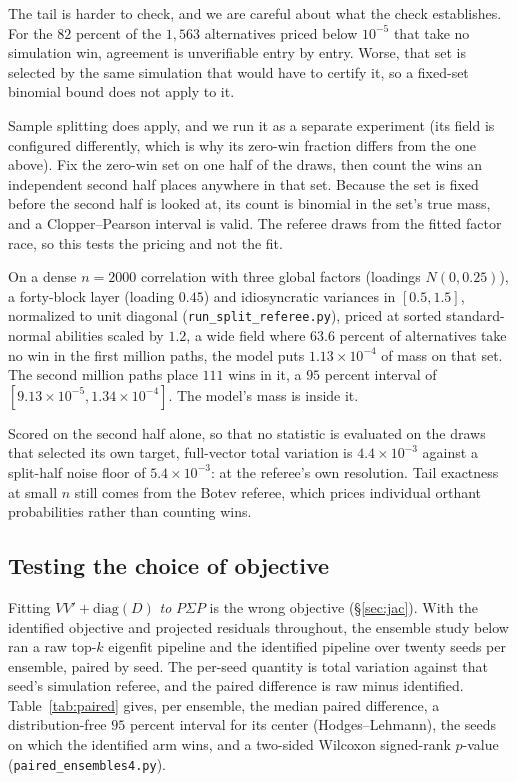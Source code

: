 \documentclass[11pt]{article}
\begin{document}
The tail is harder to check, and we are careful about what the check
establishes. For the $82$ percent of the $1{,}563$ alternatives priced below $10^{-5}$
that take no simulation win, agreement is unverifiable entry by entry. Worse, that set is
selected by the same simulation that would have to certify it, so a
fixed-set binomial bound does not apply to it.

Sample splitting does apply, and we run it as a separate experiment
(its field is configured differently, which is why its zero-win fraction
differs from the one above). Fix the zero-win set on one
half of the draws, then count the wins an independent second half places
anywhere in that set. Because the set is fixed before the second half is
looked at, its count is binomial in the set's true mass, and a
Clopper--Pearson interval is valid. The referee draws from the fitted
factor race, so this tests the pricing and not the fit.

On a dense $n=2000$ correlation with three global factors (loadings
$N(0,0.25)$), a forty-block layer (loading $0.45$) and idiosyncratic
variances in $[0.5,1.5]$, normalized to unit diagonal
(\texttt{run\_split\_referee.py}), priced at sorted standard-normal
abilities scaled by $1.2$, a wide field where $63.6$ percent of
alternatives take no win in the first million paths, the model puts
$1.13\times10^{-4}$ of mass on that set. The second million paths place
$111$ wins in it, a $95$ percent interval of
$[9.13\times10^{-5},1.34\times10^{-4}]$. The model's mass is inside it.

Scored on the second half alone, so that no statistic is evaluated on the
draws that selected its own target, full-vector total variation is
$4.4\times10^{-3}$ against a split-half noise floor of $5.4\times10^{-3}$:
at the referee's own resolution. Tail exactness at small $n$ still comes
from the Botev referee, which prices individual orthant probabilities
rather than counting wins.

\subsection{Testing the choice of objective}

Fitting
$VV'+\mathrm{diag}(D)$ \emph{to} $P\Sigma P$ is the wrong
objective (\S\ref{sec:jac}). With the identified objective and projected residuals throughout, the ensemble
study below ran a raw top-$k$ eigenfit pipeline and the identified
pipeline over twenty seeds per ensemble, paired by seed. The per-seed
quantity is total variation against that seed's simulation referee, and
the paired difference is raw minus identified. Table~\ref{tab:paired}
gives, per ensemble, the median paired difference, a distribution-free
$95$ percent interval for its center (Hodges--Lehmann), the seeds on
which the identified arm wins, and a two-sided Wilcoxon signed-rank
$p$-value (\texttt{paired\_ensembles4.py}).
\end{document}
